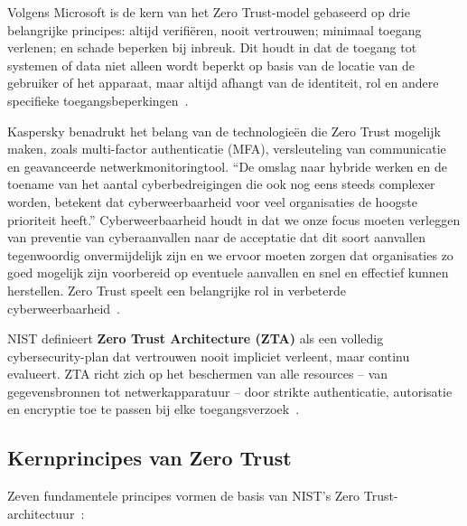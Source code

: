 Volgens Microsoft is de kern van het Zero Trust-model gebaseerd op drie belangrijke principes: altijd verifiëren, nooit vertrouwen; minimaal toegang verlenen; en schade beperken bij inbreuk. Dit houdt in dat de toegang tot systemen of data niet alleen wordt beperkt op basis van de locatie van de gebruiker of het apparaat, maar altijd afhangt van de identiteit, rol en andere specifieke toegangsbeperkingen~\autocite{Microsoft2024}. 


Kaspersky benadrukt het belang van de technologieën die Zero Trust mogelijk maken, zoals multi-factor authenticatie (MFA), versleuteling van communicatie en geavanceerde netwerkmonitoringtool. ``De omslag naar hybride werken en de toename van het aantal cyberbedreigingen die ook nog eens steeds complexer worden, betekent dat cyberweerbaarheid voor veel organisaties de hoogste prioriteit heeft.'' Cyberweerbaarheid houdt in dat we onze focus moeten verleggen van preventie van cyberaanvallen naar de acceptatie dat dit soort aanvallen tegenwoordig onvermijdelijk zijn en we ervoor moeten zorgen dat organisaties zo goed mogelijk zijn voorbereid op eventuele aanvallen en snel en effectief kunnen herstellen. Zero Trust speelt een belangrijke rol in verbeterde cyberweerbaarheid~\autocite{Kaspersky2024}.

NIST definieert \textbf{Zero Trust Architecture (ZTA)} als een volledig cybersecurity-plan dat vertrouwen nooit impliciet verleent, maar continu evalueert. ZTA richt zich op het beschermen van alle resources – van gegevensbronnen tot netwerkapparatuur – door strikte authenticatie, autorisatie en encryptie toe te passen bij elke toegangsverzoek~\autocite{NIST2020}.

\subsection{Kernprincipes van Zero Trust}
Zeven fundamentele principes vormen de basis van NIST’s Zero Trust-architectuur~\autocite{NIST2020}:  

